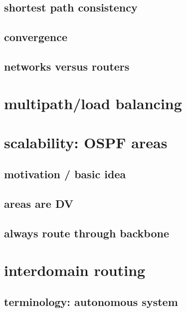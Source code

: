 \subsection{shortest path consistency}


\subsection{convergence}


\subsection{networks versus routers}
 

\section{multipath/load balancing}


\section{scalability: OSPF areas} %

\subsection{motivation / basic idea}



\subsection{areas are DV}



\subsection{always route through backbone}


\section{interdomain routing}


\subsection{terminology: autonomous system}


